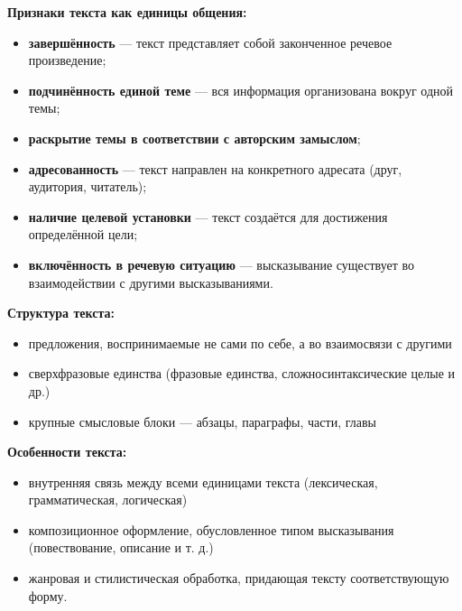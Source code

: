 \textbf{Признаки текста как единицы общения:}

\begin{itemize}
	\item \textbf{завершённость} — текст представляет собой законченное речевое произведение;
	\item \textbf{подчинённость единой теме} — вся информация организована вокруг одной темы;
	\item \textbf{раскрытие темы в соответствии с авторским замыслом};
	\item \textbf{адресованность} — текст направлен на конкретного адресата (друг, аудитория, читатель);
	\item \textbf{наличие целевой установки} — текст создаётся для достижения определённой цели;
	\item \textbf{включённость в речевую ситуацию} — высказывание существует во взаимодействии с другими высказываниями.
\end{itemize}

\textbf{Структура текста:}
\begin{itemize}
	\item предложения, воспринимаемые не сами по себе, а во взаимосвязи с другими
	\item сверхфразовые единства (фразовые единства, сложносинтаксические целые и др.)
	\item крупные смысловые блоки — абзацы, параграфы, части, главы
\end{itemize}

\textbf{Особенности текста:}
\begin{itemize}
	\item внутренняя связь между всеми единицами текста (лексическая, грамматическая, логическая)
	\item композиционное оформление, обусловленное типом высказывания (повествование, описание и т. д.)
	\item жанровая и стилистическая обработка, придающая тексту соответствующую форму.
\end{itemize}
